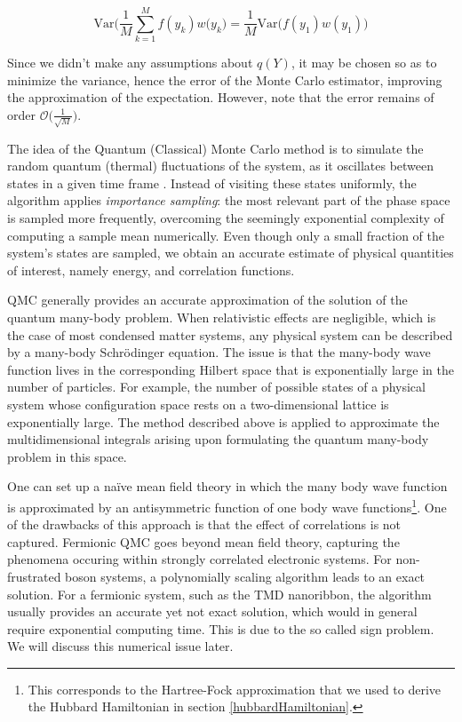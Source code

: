 \documentclass[10pt, twocolumn, twoside]{article}
\begin{document}
\begin{equation}
\text{Var}\bigg( \frac{1}{M} \sum_{k=1}^M f(y_k) w(y_k \bigg) = \frac{1}{M} \text{Var}\bigg( f(y_1) w(y_1) \bigg)
\end{equation}

Since we didn't make any assumptions about $q(Y)$, it may be chosen so as to minimize the variance, hence the error of the Monte Carlo estimator, improving the approximation of the expectation. However, note that the error remains of order $\mathcal{O}\big(\frac{1}{\sqrt{M}}\big)$.

The idea of the Quantum (Classical) Monte Carlo method is to simulate the random quantum (thermal) fluctuations of the system, as it oscillates between states in a given time frame \cite{newman_barkema}. Instead of visiting these states uniformly, the algorithm applies \emph{importance sampling}: the most relevant part of the phase space is sampled more frequently, overcoming the seemingly exponential complexity of computing a sample mean numerically. Even though only a small fraction of the system's states are sampled, we obtain an accurate estimate of physical quantities of interest, namely energy, and correlation functions.

QMC generally provides an accurate approximation of the solution of the quantum many-body problem. When relativistic effects are negligible, which is the case of most condensed matter systems, any physical system can be described by a many-body Schr\"odinger equation. The issue is that the many-body wave function lives in the corresponding Hilbert space that is  exponentially large in the number of particles. For example, the number of possible states of a physical system whose configuration space rests on a two-dimensional lattice is exponentially large. The method described above is applied to approximate the multidimensional integrals arising upon formulating the quantum many-body problem in this space.

One can set up a na\"ive mean field theory in which the many body wave function is approximated by an antisymmetric function of one body wave functions\footnote{This corresponds to the Hartree-Fock approximation that we used to derive the Hubbard Hamiltonian in section \ref{hubbardHamiltonian}.}. One of the drawbacks of this approach is that the effect of  correlations is not captured. Fermionic QMC goes beyond mean field theory,  capturing the phenomena occuring within strongly correlated electronic systems. For non-frustrated boson systems, a polynomially scaling algorithm leads to an exact solution. For a fermionic system, such as the TMD nanoribbon, the algorithm usually provides an accurate yet not exact solution, which would in general require exponential computing time. This is due to the so called sign problem. We will discuss this numerical issue later. 
\end{document}
